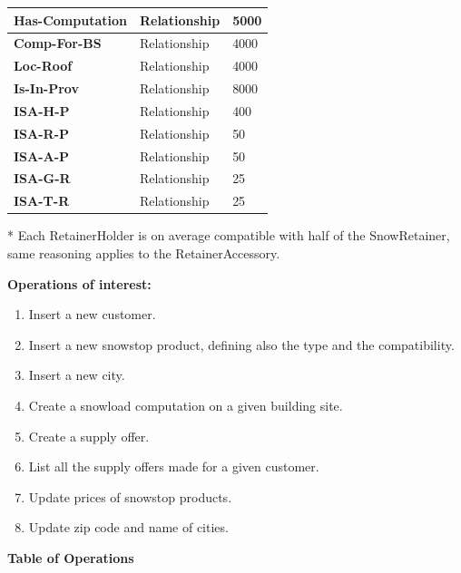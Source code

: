 \documentclass{article}[h]
\begin{document}
\begin{table}[H]
\begin{tabular}{ | m{4.5cm} | m{4.5cm}| m{4.5cm} |}
    \hline
    \color[HTML]{3531FF} \textbf{Has-Computation} & Relationship & 5000\\ 
    \hline
    \color[HTML]{3531FF} \textbf{Comp-For-BS} & Relationship & 4000\\ 
    \hline
    \color[HTML]{3531FF} \textbf{Loc-Roof} & Relationship & 4000\\ 
    \hline
    \color[HTML]{3531FF} \textbf{Is-In-Prov} & Relationship & 8000 \\ 
    \hline
    \color[HTML]{3531FF} \textbf{ISA-H-P} & Relationship & 400 \\ 
    \hline
    \color[HTML]{3531FF} \textbf{ISA-R-P} & Relationship & 50 \\ 
    \hline
    \color[HTML]{3531FF} \textbf{ISA-A-P} & Relationship & 50 \\  
    \hline
    \color[HTML]{3531FF} \textbf{ISA-G-R} & Relationship & 25 \\ 
    \hline
    \color[HTML]{3531FF} \textbf{ISA-T-R} & Relationship & 25 \\ 
    \hline
  \end{tabular}
\end{table}
\small{* Each RetainerHolder is on average compatible with half of the SnowRetainer, same reasoning applies to the RetainerAccessory.}

\pagebreak

\textbf{Operations of interest:}\label{TableOperations}
\begin{enumerate}
  \item Insert a new customer.
  \item Insert a new snowstop product, defining also the type and the compatibility.
  \item Insert a new city.
  \item Create a snowload computation on a given building site.
  \item Create a supply offer.
  \item List all the supply offers made for a given customer.
  \item Update prices of snowstop products.
  \item Update zip code and name of cities.
\end{enumerate}

\vspace{12px}

{\centering \textbf{Table of Operations}\\}
\end{document}
